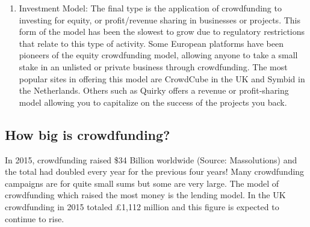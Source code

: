 \begin{enumerate}
      \item Investment Model:
            The final type is the application of crowdfunding to investing for equity, or profit/revenue sharing in businesses or projects. This form of the model has been the slowest to grow due to regulatory restrictions that relate to this type of activity. Some European platforms have been pioneers of the equity crowdfunding model, allowing anyone to take a small stake in an unlisted or private business through crowdfunding. The most popular sites in offering this model are CrowdCube in the UK and Symbid in the Netherlands. Others such as
            Quirky offers a revenue or profit-sharing model allowing you to capitalize on the success of the projects you back.
\end{enumerate}


\subsection*{ How big is crowdfunding? }
In 2015, crowdfunding raised \$34 Billion worldwide (Source: Massolutions) and the total had doubled every year for the previous four years! Many crowdfunding campaigns are for quite small sums but some are very large. The model of crowdfunding which raised the most money is the lending model. In the UK crowdfunding in 2015 totaled £1,112 million and this figure is expected to continue to rise.


